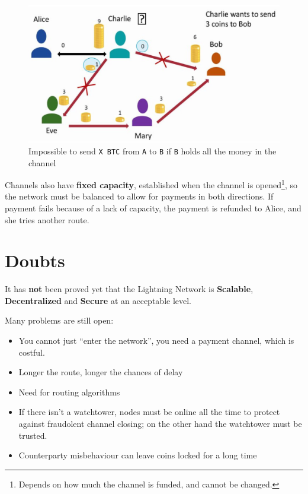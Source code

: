 \begin{paracol}{2}
   \begin{figure}[htbp]
      \centering
      \includegraphics{images/lightning_capacity.png}
      \caption{Impossible to send \texttt{X BTC} from \texttt{A} to \texttt{B} if \texttt{B} holds all the money in the channel}
      \label{fig:lightning_capacity}
   \end{figure}
   \switchcolumn
   Channels also have \textbf{fixed capacity}, established when the channel is opened\footnote{Depends on how much the channel is funded, and cannot be changed.}, so the network must be balanced to allow for payments in both directions. 
   If payment fails because of a lack of capacity, the payment is refunded to Alice, and she tries another route.
\end{paracol}

\section{Doubts}
It has \textbf{not} been proved yet that the Lightning Network is \textbf{Scalable}, \textbf{Decentralized} and \textbf{Secure} at an acceptable level.

Many problems are still open:
\begin{itemize}
   \item You cannot just ``enter the network'', you need a payment channel, which is costful.
   \item Longer the route, longer the chances of delay
   \item Need for routing algorithms
   \item If there isn't a watchtower, nodes must be online all the time to protect against fraudolent channel closing; on the other hand the watchtower must be trusted.
   \item Counterparty misbehaviour can leave coins locked for a long time
\end{itemize}